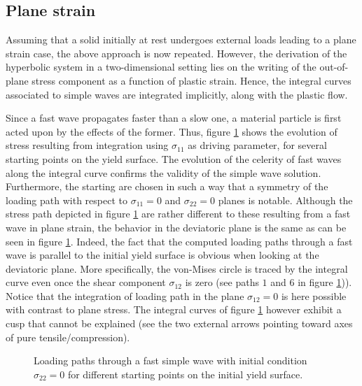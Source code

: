 \newpage
\subsection{Plane strain}
Assuming that a solid initially at rest undergoes external loads leading to a plane strain case, the above approach is now repeated.
However, the derivation of the hyperbolic system in a two-dimensional setting lies on the writing of the out-of-plane stress component as a function of plastic strain.
Hence, the integral curves associated to simple waves are integrated implicitly, along with the plastic flow.

Since a fast wave propagates faster than a slow one, a material particle is first acted upon by the effects of the former. 
Thus, figure \ref{fig:fast_path_plane_strains} shows the evolution of stress resulting from integration using $\sigma_{11}$ as driving parameter, for several starting points on the yield surface.
The evolution of the celerity of fast waves along the integral curve confirms the validity of the simple wave solution.
Furthermore, the starting are chosen in such a way that a symmetry of the loading path with respect to $\sigma_{11}=0$ and $\sigma_{22}=0$ planes is notable.
Although the stress path depicted in figure \ref{fig:fast_path_plane_strains} are rather different to these resulting from a fast wave in plane strain, the behavior in the deviatoric plane is the same as can be seen in figure \ref{fig:fast_path_plane_strains}. 
Indeed, the fact that the computed loading paths through a fast wave is parallel to the initial yield surface is obvious when looking at the deviatoric plane.
More specifically, the von-Mises circle is traced by the integral curve even once the shear component $\sigma_{12}$ is zero (see paths $1$ and $6$ in figure \ref{fig:fast_path_plane_strains})).
Notice that the integration of loading path in the plane $\sigma_{12}=0$ is here possible with contrast to plane stress.
The integral curves of figure \ref{fig:fast_path_plane_strains} however exhibit a cusp that cannot be explained (see the two external arrows pointing toward axes of pure tensile/compression).
\begin{figure}[h!]
  \centering
  \caption{Loading paths through a fast simple wave with initial condition $\sigma_{22}=0$ for different starting points on the initial yield surface.}
  \label{fig:fast_path_plane_strains}
\end{figure}

